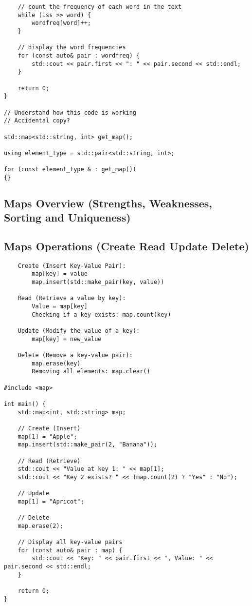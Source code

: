 \begin{verbatim}
    // count the frequency of each word in the text
    while (iss >> word) {
        wordfreq[word]++;
    }

    // display the word frequencies
    for (const auto& pair : wordfreq) {
        std::cout << pair.first << ": " << pair.second << std::endl;
    }

    return 0;
}

// Understand how this code is working
// Accidental copy?

std::map<std::string, int> get_map();

using element_type = std::pair<std::string, int>;

for (const element_type & : get_map())
{}
\end{verbatim}

 
\subsection{Maps Overview (Strengths, Weaknesses, Sorting and Uniqueness)}

\subsection{Maps Operations (Create Read Update Delete)}

\begin{verbatim}
    Create (Insert Key-Value Pair):
        map[key] = value 
        map.insert(std::make_pair(key, value))

    Read (Retrieve a value by key):
        Value = map[key]
        Checking if a key exists: map.count(key)

    Update (Modify the value of a key):
        map[key] = new_value

    Delete (Remove a key-value pair):
        map.erase(key)
        Removing all elements: map.clear()

#include <map>

int main() {
    std::map<int, std::string> map;

    // Create (Insert)
    map[1] = "Apple";
    map.insert(std::make_pair(2, "Banana"));

    // Read (Retrieve)
    std::cout << "Value at key 1: " << map[1];
    std::cout << "Key 2 exists? " << (map.count(2) ? "Yes" : "No");

    // Update
    map[1] = "Apricot";

    // Delete
    map.erase(2);

    // Display all key-value pairs
    for (const auto& pair : map) {
        std::cout << "Key: " << pair.first << ", Value: " << pair.second << std::endl;
    }

    return 0;
}
\end{verbatim}

